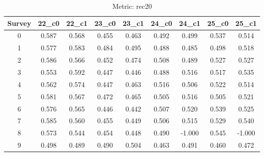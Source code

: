 \documentclass{article}
\begin{document}
\begin{table}[tbh]
\begin{center}
\begin{tabular}{|*{9}{c|}}
\hline
 Survey & 22\_c0 & 22\_c1 & 23\_c0 & 23\_c1 & 24\_c0 & 24\_c1 & 25\_c0 & 25\_c1 \\ 
\hline
0 & 0.587 & 0.568 & 0.455 & 0.463 & 0.492 & 0.499 & 0.537 & 0.514 \\ 
1 & 0.577 & 0.583 & 0.484 & 0.495 & 0.488 & 0.485 & 0.498 & 0.518 \\ 
2 & 0.586 & 0.566 & 0.452 & 0.474 & 0.508 & 0.489 & 0.527 & 0.527 \\ 
3 & 0.553 & 0.592 & 0.447 & 0.446 & 0.488 & 0.516 & 0.517 & 0.535 \\ 
4 & 0.562 & 0.574 & 0.447 & 0.463 & 0.516 & 0.506 & 0.522 & 0.514 \\ 
5 & 0.581 & 0.567 & 0.472 & 0.465 & 0.505 & 0.516 & 0.505 & 0.521 \\ 
6 & 0.576 & 0.565 & 0.446 & 0.442 & 0.507 & 0.520 & 0.539 & 0.525 \\ 
7 & 0.585 & 0.560 & 0.455 & 0.449 & 0.506 & 0.515 & 0.529 & 0.540 \\ 
8 & 0.573 & 0.544 & 0.454 & 0.448 & 0.490 & -1.000 & 0.545 & -1.000 \\ 
9 & 0.498 & 0.489 & 0.490 & 0.504 & 0.463 & 0.491 & 0.460 & 0.472 \\ 
\hline
\end{tabular}
\end{center}
\caption{Metric: rec20}
\end{table}
\end{document}
